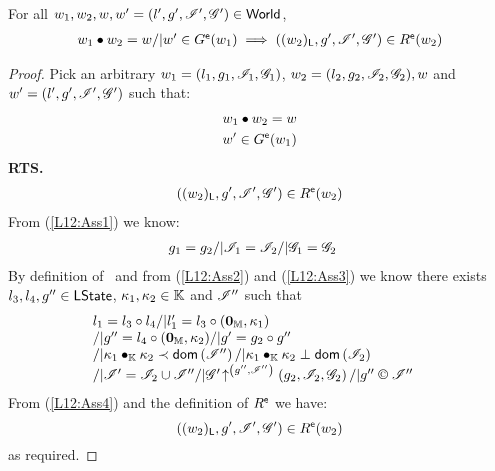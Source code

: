 %
%
\begin{lemma}[]\label{lem:extendGContainment}
%
For all $w_1, w_2, w, w' = (l', g', \mathscr{I}', \mathscr{G}') \in \textsf{World}$,
\[
\begin{array}{l}
	w_1 \bullet w_2 = w /| w' \in G^{\textsf{e}}(w_1) \implies ((w_2)_{\textsf{L}}, g', \mathscr{I}', \mathscr{G}') \in R^{\textsf{e}}(w_2)
\end{array}
\]
%
\begin{proof} Pick an arbitrary $w_1 = (l_1, g_1, \mathscr{I}_{1}, \mathscr{G}_{1})$, $w_2 = (l_2, g_2, \mathscr{I}_{2}, \mathscr{G}_{2}), w$ and $ w' = (l', g', \mathscr{I}', \mathscr{G}')$ such that:
%
\begin{align}
	& w_1 \bullet  w_2 = w \label{L12:Ass1}\\
	& w' \in G^{\textsf{e}}(w_1) \label{L12:Ass2}
\end{align}
%
\textbf{RTS.}
%
\begin{align*}
	((w_2)_{\textsf{L}}, g', \mathscr{I}', \mathscr{G}') \in R^{\textsf{e}}(w_2) 
\end{align*}
%
From (\ref{L12:Ass1}) we know:
%
\begin{align}
	& g_1 = g_2 /| \mathscr{I}_{1} = \mathscr{I}_{2} /| \mathscr{G}_{1} = \mathscr{G}_{2} \label{L12:Ass3}
\end{align}
By definition of \extendG\ and from (\ref{L12:Ass2}) and (\ref{L12:Ass3}) we know there exists $l_3, l_4, g'' \in \textsf{LState}$, $\kappa_{1}, \kappa_{2} \in \mathbb{K}$ and $\mathscr{I}''$ such that
%
\begin{align}
& \begin{array}{l}
	l_1 = l_3 \composeL l_4 /| l'_1 = l_3 \composeL (\unitH, \ca{1})  \\
	/| g'' = l_4 \composeL (\unitH, \ca{2}) /| g' = g_2 \composeL g'' \\
	/| \ca{1} \composeCap \ca{2} \containedIn \dom{\lmod''} /|  \ca{1} \composeCap \ca{2} \disjoint \dom{\lmod_{2}} \\
	/| \lmod' = \lmod_{2} \cup \lmod'' 
	/| \expandsAM{\gmod'}{g''}{\lmod''}{g_2}{\lmod_{2}}{\gmod_{2}}  
	/| g'' \containI \lmod'' 
\end{array}
\label{L12:Ass4}
\end{align}
%
From (\ref{L12:Ass4}) and the definition of $R^{\textsf{e}}$ we have:
%
\begin{equation*}
	((w_2)_{\textsf{L}}, g', \mathscr{I}{}', \mathscr{G}{}') \in R^{\textsf{e}}(w_2) 
\end{equation*}
% 
as required.
\end{proof}
%
%
\end{lemma}
%
%
